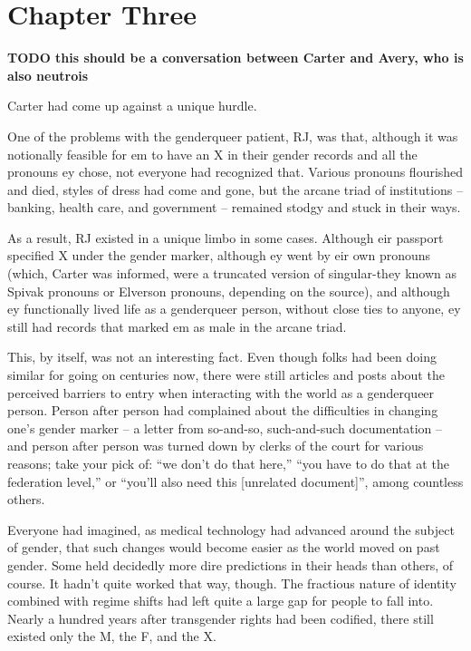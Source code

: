 \chapter*{Chapter Three}

\textbf{TODO this should be a conversation between Carter and Avery, who is also neutrois}

Carter had come up against a unique hurdle.

One of the problems with the genderqueer patient, RJ, was that, although it was notionally feasible for em to have an X in their gender records and all the pronouns ey chose, not everyone had recognized that. Various pronouns flourished and died, styles of dress had come and gone, but the arcane triad of institutions -- banking, health care, and government -- remained stodgy and stuck in their ways.

As a result, RJ existed in a unique limbo in some cases. Although eir passport specified X under the gender marker, although ey went by eir own pronouns (which, Carter was informed, were a truncated version of singular-they known as Spivak pronouns or Elverson pronouns, depending on the source), and although ey functionally lived life as a genderqueer person, without close ties to anyone, ey still had records that marked em as male in the arcane triad.

This, by itself, was not an interesting fact. Even though folks had been doing similar for going on centuries now, there were still articles and posts about the perceived barriers to entry when interacting with the world as a genderqueer person. Person after person had complained about the difficulties in changing one's gender marker -- a letter from so-and-so, such-and-such documentation -- and person after person was turned down by clerks of the court for various reasons; take your pick of: ``we don't do that here,'' ``you have to do that at the federation level,'' or ``you'll also need this [unrelated document]'', among countless others.

Everyone had imagined, as medical technology had advanced around the subject of gender, that such changes would become easier as the world moved on past gender. Some held decidedly more dire predictions in their heads than others, of course. It hadn't quite worked that way, though. The fractious nature of identity combined with regime shifts had left quite a large gap for people to fall into. Nearly a hundred years after transgender rights had been codified, there still existed only the M, the F, and the X.

